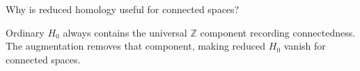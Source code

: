\begin{problem}\label{prob:viii16-22}
Why is reduced homology useful for connected spaces?
\end{problem}
\begin{solution}
Ordinary \(H_0\) always contains the universal \(\mathbb Z\) component recording connectedness. The augmentation removes that component, making reduced \(H_0\) vanish for connected spaces.
\end{solution}
